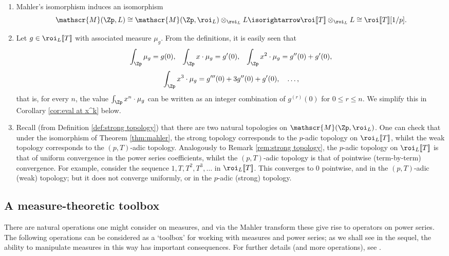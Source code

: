 \documentclass[a4paper,10pt, english, reqno]{smfart}
\newcommand{\lsem}{[\! [}
\newcommand{\rsem}{]\! ]}
\newcommand{\sM}{\mathscr{M}}
\numberwithin{equation}{section}
\begin{document}
\begin{remark} \label{integ} %
\begin{enumerate}
    \item Mahler's isomorphism induces an isomorphism 
    \[
    	\mathscr{M}(\Zp, L) \cong \sM(\Zp,\roi_L) \otimes_{\roi_L} L \isorightarrow \roi\lsem T\rsem \otimes_{\roi_L}L \cong  \roi\lsem T\rsem[1/p].
    \]
    \item Let $g \in \roi_L\lsem T\rsem $ with associated measure $\mu_g$. From the definitions, it is easily seen that
\[\int_{\Zp}\mu_g = g(0), \;\;\; \int_{\Zp} x \cdot \mu_g = g'(0), \;\;\; \int_{\Zp} x^2 \cdot \mu_g = g''(0) + g'(0), \]
\[
\int_{\Zp}x^3 \cdot \mu_g = g'''(0) + 3g''(0) + g'(0), \ \ \ \ldots, 
\]
that is, for every $n$, the value $\int_{\Zp} x^n \cdot \mu_g$ can be written as an integer combination of $g^{(r)}(0)$ for $0 \leq r\leq n$. We simplify this in Corollary \ref{cor:eval at x^k} below.

\item Recall (from Definition \ref{def:strong topology}) that there are two natural topologies on $\sM(\Zp,\roi_L)$. One can check that under the isomorphism of Theorem \ref{thm:mahler}, the strong topology corresponds to the $p$-adic topology on $\roi_L\lsem T\rsem$, whilst the weak topology corresponds to the $(p,T)$-adic topology. Analogously to Remark \ref{rem:strong topology}, the $p$-adic topology on $\roi_L\lsem T\rsem$ is that of uniform convergence in the power series coefficients, whilst the $(p,T)$-adic topology is that of pointwise (term-by-term) convergence. For example, consider the sequence $1, T, T^2, T^3, \dots$ in $\roi_L\lsem T\rsem$. This converges to 0 pointwise, and in the $(p,T)$-adic (weak) topology; but it does not converge uniformly, or in the $p$-adic (strong) topology.
\end{enumerate}
\end{remark}



\subsection{A measure-theoretic toolbox}\label{sec:toolbox}
There are natural operations one might consider on measures, and via the Mahler transform these give rise to operators on power series. The following operations can be considered as a `toolbox' for working with measures and power series; as we shall see in the sequel, the ability to manipulate measures in this way has important consequences. For further details (and more operations), see \cite{Colm10}.
\end{document}
